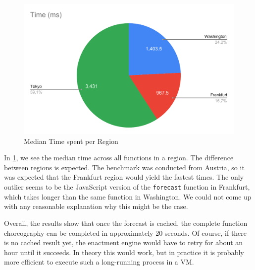 \begin{figure}[h]
  \centering
  \includegraphics[width=\textwidth, keepaspectratio]{./assets/evaluation-region}
  \caption{Median Time spent per Region}
  \label{fig:time_per_region}
\end{figure}

In \cref{fig:time_per_region}, we see the median time across all functions in a region.
The difference between regions is expected. The benchmark was conducted from Austria,
so it was expected that the Frankfurt region would yield the fastest times. The only outlier
seems to be the JavaScript version of the \texttt{forecast} function in Frankfurt, which
takes longer than the same function in Washington. We could not come up with any
reasonable explanation why this might be the case.

Overall, the results show that once the forecast is cached, the complete function choreography
can be completed in approximately 20 seconds. Of course, if there is no cached result yet,
the enactment engine would have to retry for about an hour until it succeeds. In theory this
would work, but in practice it is probably more efficient to execute such a long-running process
in a VM.
